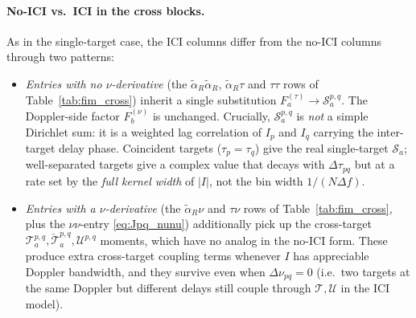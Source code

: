 \documentclass[11pt]{article}
\begin{document}
\paragraph{No-ICI vs.\ ICI in the cross blocks.} As in the
single-target case, the ICI columns differ from the no-ICI columns
through two patterns:
\begin{itemize}
    \item \emph{Entries with no \(\nu\)-derivative} (the
          \(\tilde{\alpha}_R\tilde{\alpha}_R\),
          \(\tilde{\alpha}_R\tau\) and \(\tau\tau\) rows of
          Table~\ref{tab:fim_cross}) inherit a single substitution
          \(F_a^{(\tau)} \to \mathcal{S}_a^{p,q}\). The Doppler-side
          factor \(F_b^{(\nu)}\) is unchanged. Crucially,
          \(\mathcal{S}_a^{p,q}\) is \emph{not} a simple Dirichlet
          sum: it is a weighted lag correlation of \(I_p\) and
          \(I_q\) carrying the inter-target delay phase. Coincident
          targets (\(\tau_p = \tau_q\)) give the real
          single-target \(\mathcal{S}_a\); well-separated targets
          give a complex value that decays with \(\Delta\tau_{pq}\)
          but at a rate set by the \emph{full kernel width} of
          \(|I|\), not the bin width \(1/(N\Delta f)\).
    \item \emph{Entries with a \(\nu\)-derivative} (the
          \(\tilde{\alpha}_R\nu\) and \(\tau\nu\) rows of
          Table~\ref{tab:fim_cross}, plus the \(\nu\nu\)-entry
          \eqref{eq:Jpq_nunu}) additionally pick up the cross-target
          \(\mathcal{T}_a^{p,q}, \check{\mathcal{T}}_a^{p,q},
          \mathcal{U}^{p,q}\) moments, which have no analog in the
          no-ICI form. These produce extra cross-target coupling
          terms whenever \(I\) has appreciable Doppler bandwidth, and
          they survive even when \(\Delta\nu_{pq}=0\) (i.e.\ two
          targets at the same Doppler but different delays still
          couple through \(\mathcal{T},\mathcal{U}\) in the ICI
          model).
\end{itemize}
\end{document}
